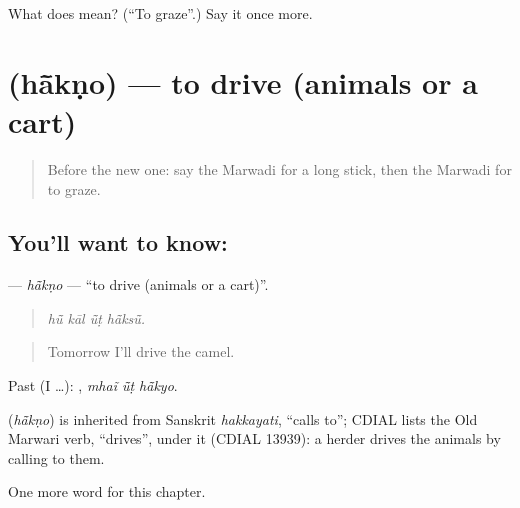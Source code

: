 \begin{tcolorbox}[breakable,colback=teal!4,colframe=teal!35!black,title={Before you move on}]
What does  mean? (\textquotedblleft{}To graze\textquotedblright{}.) Say it once more.
\end{tcolorbox}
\section[\texorpdfstring{\mw{हांकणो} (hā̃kṇo)}{हांकणो (hā̃kṇo)}]{ (hā̃kṇo) — to drive (animals or a cart)}

\label{lesson:MW-C234-hakno}



\begin{quote}
Before the new one: say the Marwadi for a long stick, then the Marwadi for to graze.
\end{quote}

\subsection*{You'll want to know: }
\textbf{} — \emph{hā̃kṇo} — \textquotedblleft{}to drive (animals or a cart)\textquotedblright{}.

\begin{quote}
   
\end{quote}

\begin{quote}
\emph{hū̃ kāl ū̃ṭ hā̃ksū̃.}
\end{quote}

\begin{quote}
Tomorrow I'll drive the camel.
\end{quote}

Past (I …):   , \emph{mhaĩ ū̃ṭ hā̃kyo}.

\begin{cousinweb}
\textbf{} (\emph{hā̃kṇo}) is inherited from Sanskrit \emph{hakkayati}, \textquotedblleft{}calls to\textquotedblright{}; CDIAL lists the Old Marwari verb, \textquotedblleft{}drives\textquotedblright{}, under it (CDIAL 13939): a herder drives the animals by calling to them.
\end{cousinweb}

\begin{grammarlens}[title={What you've built}]
One more word for this chapter.
\end{grammarlens}

